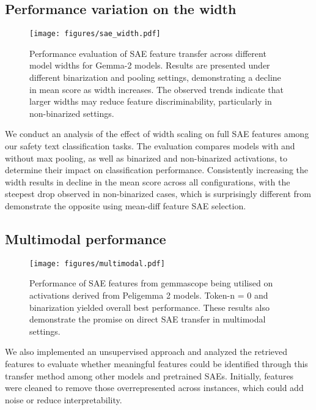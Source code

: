 \FloatBarrier

\FloatBarrier
\newpage
\subsection{Performance variation on the width}
\label{app:width}
\begin{figure}[h!]
    \centering
    \texttt{[image: figures/sae\_width.pdf]}
    \caption{Performance evaluation of SAE feature transfer across different model widths for Gemma-2 models. Results are presented under different binarization and pooling settings, demonstrating a decline in mean score as width increases. The observed trends indicate that larger widths may reduce feature discriminability, particularly in non-binarized settings.}
    \label{fig:width-performance}
\end{figure}

We conduct an analysis of the effect of width scaling on full SAE features among our safety text classification tasks. The evaluation compares models with and without max pooling, as well as binarized and non-binarized activations, to determine their impact on classification performance. Consistently increasing the width results in decline in the mean score across all configurations, with the steepest drop observed in non-binarized cases, which is surprisingly different from \citet{sae_probing} demonstrate the opposite using mean-diff feature SAE selection.


\newpage
\subsection{Multimodal performance}
\label{app:multimodal}

\begin{figure}[h!]
    \centering
    \texttt{[image: figures/multimodal.pdf]}
    \caption{Performance of SAE features from gemmascope being utilised on activations derived from Peligemma 2 models. Token-n = 0 and binarization yielded overall best performance. These results also demonstrate the promise on direct SAE transfer in multimodal settings.}
    \label{fig:enter-label}
\end{figure}

We also implemented an unsupervised approach and analyzed the retrieved features to evaluate whether meaningful features could be identified through this transfer method among other models and pretrained SAEs. Initially, features were cleaned to remove those overrepresented across instances, which could add noise or reduce interpretability. 

